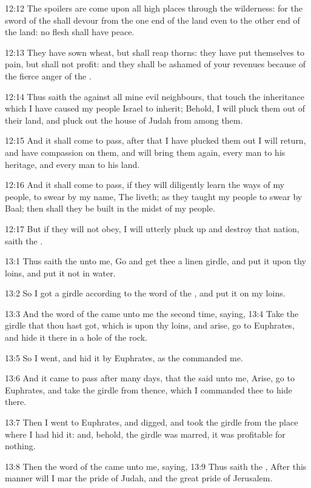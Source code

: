 12:12 The spoilers are come upon all high places through the wilderness: for the sword of the \LORD shall devour from the one end of the land even to the other end of the land: no flesh shall have peace.

12:13 They have sown wheat, but shall reap thorns: they have put themselves to pain, but shall not profit: and they shall be ashamed of your revenues because of the fierce anger of the \LORD.

12:14 Thus saith the \LORD against all mine evil neighbours, that touch the inheritance which I have caused my people Israel to inherit; Behold, I will pluck them out of their land, and pluck out the house of Judah from among them.

12:15 And it shall come to pass, after that I have plucked them out I will return, and have compassion on them, and will bring them again, every man to his heritage, and every man to his land.

12:16 And it shall come to pass, if they will diligently learn the ways of my people, to swear by my name, The \LORD liveth; as they taught my people to swear by Baal; then shall they be built in the midst of my people.

12:17 But if they will not obey, I will utterly pluck up and destroy that nation, saith the \LORD.

13:1 Thus saith the \LORD unto me, Go and get thee a linen girdle, and put it upon thy loins, and put it not in water.

13:2 So I got a girdle according to the word of the \LORD, and put it on my loins.

13:3 And the word of the \LORD came unto me the second time, saying, 13:4 Take the girdle that thou hast got, which is upon thy loins, and arise, go to Euphrates, and hide it there in a hole of the rock.

13:5 So I went, and hid it by Euphrates, as the \LORD commanded me.

13:6 And it came to pass after many days, that the \LORD said unto me, Arise, go to Euphrates, and take the girdle from thence, which I commanded thee to hide there.

13:7 Then I went to Euphrates, and digged, and took the girdle from the place where I had hid it: and, behold, the girdle was marred, it was profitable for nothing.

13:8 Then the word of the \LORD came unto me, saying, 13:9 Thus saith the \LORD, After this manner will I mar the pride of Judah, and the great pride of Jerusalem.

